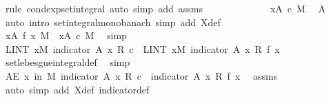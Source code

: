 \begin{isabellebody}
\ {\isacharparenleft}{\kern0pt}rule\ cond{\isacharunderscore}{\kern0pt}exp{\isacharunderscore}{\kern0pt}set{\isacharunderscore}{\kern0pt}integral{\isacharcomma}{\kern0pt}\ auto\ simp\ add{\isacharcolon}{\kern0pt}\ assms{\isacharparenright}{\kern0pt}\isanewline
\ \ \ \ \ \ \ \ \isamarkupfalse%
\ \isamarkupfalse%
\ {\isachardoublequoteopen}{\isachardot}{\kern0pt}{\isachardot}{\kern0pt}{\isachardot}{\kern0pt}\ {\isasymle}\ {\isacharparenleft}{\kern0pt}{\isasymintegral}x{\isasymin}A{\isachardot}{\kern0pt}\ c\ {\isasympartial}M{\isacharparenright}{\kern0pt}{\isachardoublequoteclose}\ \isamarkupfalse%
\ A\ \isamarkupfalse%
\ {\isacharparenleft}{\kern0pt}auto\ intro{\isacharbang}{\kern0pt}{\isacharcolon}{\kern0pt}\ set{\isacharunderscore}{\kern0pt}integral{\isacharunderscore}{\kern0pt}mono{\isacharunderscore}{\kern0pt}banach\ simp\ add{\isacharcolon}{\kern0pt}\ X{\isacharunderscore}{\kern0pt}def{\isacharparenright}{\kern0pt}\isanewline
\ \ \ \ \ \ \ \ \isamarkupfalse%
\ \isamarkupfalse%
\ {\isachardoublequoteopen}{\isacharparenleft}{\kern0pt}{\isasymintegral}x{\isasymin}A{\isachardot}{\kern0pt}\ f\ x\ {\isasympartial}M{\isacharparenright}{\kern0pt}\ {\isasymle}\ {\isacharparenleft}{\kern0pt}{\isasymintegral}x{\isasymin}A{\isachardot}{\kern0pt}\ c\ {\isasympartial}M{\isacharparenright}{\kern0pt}{\isachardoublequoteclose}\ \isamarkupfalse%
\ simp\isanewline
\ \ \ \ \ \ \isacommand{{\isacharbraceright}{\kern0pt}}\isamarkupfalse%
\isanewline
\ \ \ \ \ \ \isamarkupfalse%
\ \isamarkupfalse%
\ {\isachardoublequoteopen}LINT\ x{\isacharbar}{\kern0pt}M{\isachardot}{\kern0pt}\ indicator\ A\ x\ {\isacharasterisk}{\kern0pt}\isactrlsub R\ c\ {\isacharequal}{\kern0pt}\ LINT\ x{\isacharbar}{\kern0pt}M{\isachardot}{\kern0pt}\ indicator\ A\ x\ {\isacharasterisk}{\kern0pt}\isactrlsub R\ f\ x{\isachardoublequoteclose}\ \isamarkupfalse%
\ set{\isacharunderscore}{\kern0pt}lebesgue{\isacharunderscore}{\kern0pt}integral{\isacharunderscore}{\kern0pt}def\ \isamarkupfalse%
\ simp\isanewline
\ \ \ \ \ \ \isamarkupfalse%
\ {\isachardoublequoteopen}AE\ x\ in\ M{\isachardot}{\kern0pt}\ indicator\ A\ x\ {\isacharasterisk}{\kern0pt}\isactrlsub R\ c\ {\isasymle}\ indicator\ A\ x\ {\isacharasterisk}{\kern0pt}\isactrlsub R\ f\ x{\isachardoublequoteclose}\ \isamarkupfalse%
\ assms\ \isamarkupfalse%
\ {\isacharparenleft}{\kern0pt}auto\ simp\ add{\isacharcolon}{\kern0pt}\ X{\isacharunderscore}{\kern0pt}def\ indicator{\isacharunderscore}{\kern0pt}def{\isacharparenright}{\kern0pt}\isanewline

\end{isabellebody}
